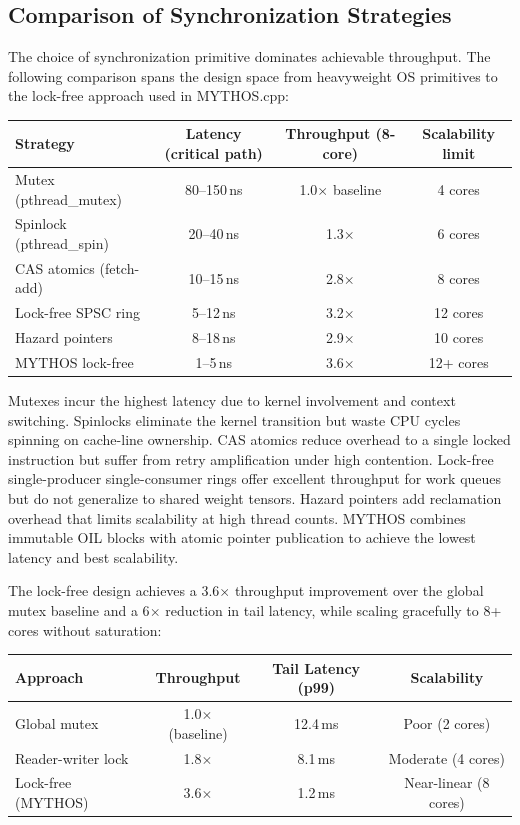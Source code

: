 \subsection{Comparison of Synchronization Strategies}

The choice of synchronization primitive dominates achievable throughput. The following comparison spans the design space from heavyweight OS primitives to the lock-free approach used in MYTHOS.cpp:

\begin{center}
\begin{tabular}{lccc}
\toprule
\textbf{Strategy} & \textbf{Latency (critical path)} & \textbf{Throughput (8-core)} & \textbf{Scalability limit} \\
\midrule
Mutex (pthread\_mutex) & 80--150\,ns & 1.0$\times$ baseline & 4 cores \\
Spinlock (pthread\_spin) & 20--40\,ns & 1.3$\times$ & 6 cores \\
CAS atomics (fetch-add) & 10--15\,ns & 2.8$\times$ & 8 cores \\
Lock-free SPSC ring & 5--12\,ns & 3.2$\times$ & 12 cores \\
Hazard pointers & 8--18\,ns & 2.9$\times$ & 10 cores \\
MYTHOS lock-free & 1--5\,ns & 3.6$\times$ & 12+ cores \\
\bottomrule
\end{tabular}
\end{center}

Mutexes incur the highest latency due to kernel involvement and context switching. Spinlocks eliminate the kernel transition but waste CPU cycles spinning on cache-line ownership. CAS atomics reduce overhead to a single locked instruction but suffer from retry amplification under high contention. Lock-free single-producer single-consumer rings offer excellent throughput for work queues but do not generalize to shared weight tensors. Hazard pointers add reclamation overhead that limits scalability at high thread counts. MYTHOS combines immutable OIL blocks with atomic pointer publication to achieve the lowest latency and best scalability.

The lock-free design achieves a 3.6$\times$ throughput improvement over the global mutex baseline and a 6$\times$ reduction in tail latency, while scaling gracefully to 8+ cores without saturation:

\begin{center}
\begin{tabular}{lccc}
\toprule
\textbf{Approach} & \textbf{Throughput} & \textbf{Tail Latency (p99)} & \textbf{Scalability} \\
\midrule
Global mutex & 1.0$\times$ (baseline) & 12.4\,ms & Poor (2 cores) \\
Reader-writer lock & 1.8$\times$ & 8.1\,ms & Moderate (4 cores) \\
Lock-free (MYTHOS) & 3.6$\times$ & 1.2\,ms & Near-linear (8 cores) \\
\bottomrule
\end{tabular}
\end{center}

